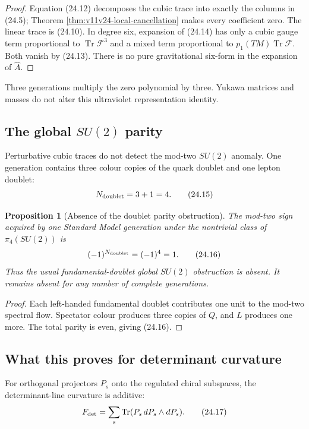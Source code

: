 \documentclass[11pt]{article}
\newtheorem{proposition}[theorem]{Proposition}
\newcommand{\Tr}{\operatorname{Tr}}
\begin{document}
\begin{proof}
Equation (24.12) decomposes the cubic trace into exactly the columns in
(24.5); Theorem \ref{thm:v11v24-local-cancellation} makes every
coefficient zero.  The linear trace is (24.10).  In degree six, expansion
of (24.14) has only a cubic gauge term proportional to
\(\Tr\mathcal F^3\) and a mixed term proportional to
\(p_1(TM)\Tr\mathcal F\).  Both vanish by (24.13).
There is no pure gravitational six-form in the expansion of
\(\widehat A\).
\end{proof}

Three generations multiply the zero polynomial by three.  Yukawa
matrices and masses do not alter this ultraviolet representation
identity.

\subsection{The global \(SU(2)\) parity}

Perturbative cubic traces do not detect the mod-two \(SU(2)\) anomaly.
One generation contains three colour copies of the quark doublet and
one lepton doublet:
\[
 N_{\rm doublet}=3+1=4.
 \tag{24.15}
\]

\begin{proposition}[Absence of the doublet parity obstruction]
\label{prop:v11v24-witten}
The mod-two sign acquired by one Standard Model generation under the
nontrivial class of \(\pi_4(SU(2))\) is
\[
 (-1)^{N_{\rm doublet}}=(-1)^4=1.
 \tag{24.16}
\]
Thus the usual fundamental-doublet global \(SU(2)\) obstruction is
absent.  It remains absent for any number of complete generations.
\end{proposition}

\begin{proof}
Each left-handed fundamental doublet contributes one unit to the
mod-two spectral flow.  Spectator colour produces three copies of
\(Q\), and \(L\) produces one more.  The total parity is even, giving
(24.16).
\end{proof}

\subsection{What this proves for determinant curvature}

For orthogonal projectors \(P_s\) onto the regulated chiral subspaces,
the determinant-line curvature is additive:
\[
 F_{\rm det}
 =
 \sum_s\Tr(P_s\,dP_s\wedge dP_s).
 \tag{24.17}
\]
\end{document}
